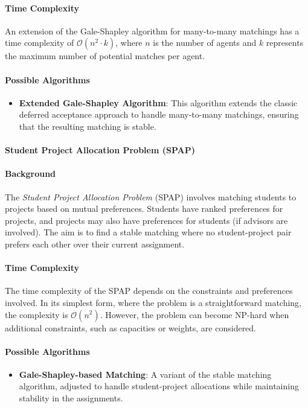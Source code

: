 \paragraph{Time Complexity}
An extension of the Gale-Shapley algorithm for many-to-many matchings has a time complexity of \(\mathcal{O}(n^2 \cdot k)\), where \(n\) is the number of agents and \(k\) represents the maximum number of potential matches per agent. \cite{survey}

\paragraph{Possible Algorithms}
\begin{itemize}
    \item \textbf{Extended Gale-Shapley Algorithm}: This algorithm extends the classic deferred acceptance approach to handle many-to-many matchings, ensuring that the resulting matching is stable. \cite{gusfield}
\end{itemize}

\paragraph{Student Project Allocation Problem (SPAP)}

\paragraph{Background}
The \emph{Student Project Allocation Problem} (SPAP) involves matching students to projects based on mutual preferences. Students have ranked preferences for projects, and projects may also have preferences for students (if advisors are involved). The aim is to find a stable matching where no student-project pair prefers each other over their current assignment. \cite{survey}

\paragraph{Time Complexity}
The time complexity of the SPAP depends on the constraints and preferences involved. In its simplest form, where the problem is a straightforward matching, the complexity is \(\mathcal{O}(n^2)\). However, the problem can become NP-hard when additional constraints, such as capacities or weights, are considered. \cite{survey}

\paragraph{Possible Algorithms}
\begin{itemize}
    \item \textbf{Gale-Shapley-based Matching}: A variant of the stable matching algorithm, adjusted to handle student-project allocations while maintaining stability in the assignments. \cite{gusfield}
\end{itemize} 

